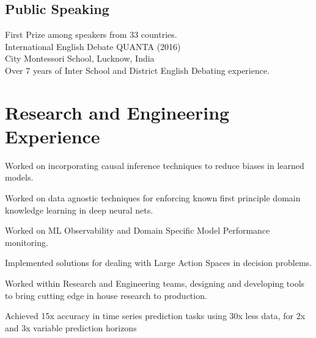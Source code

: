 \documentclass[]{deedy-resume-openfont}
\begin{document}
\begin{minipage}[t]{0.33\textwidth}
\subsection{Public Speaking}
\textbullet{} First Prize among speakers from 33 countries. \\
International English Debate QUANTA (2016) \\
City Montessori School, Lucknow, India \\
\textbullet{} Over 7 years of Inter School and District English Debating experience.
\sectionsep

%
%

\end{minipage} 
\hfill
\begin{minipage}[t]{0.66\textwidth} 


\section{Research and Engineering Experience}
\vspace{\topsep} %
\begin{tightemize}
        \item {Worked on incorporating causal inference techniques to reduce biases in learned models.}
        \item {Worked on data agnostic techniques for enforcing known first principle domain knowledge learning in deep neural nets.}
        \item {Worked on ML Observability and Domain Specific Model Performance monitoring.}
        \item {Implemented solutions for dealing with Large Action Spaces in decision problems.}
        \item {Worked within Research and Engineering teams, designing and developing tools to bring cutting edge in house research to production.}
        \item {Achieved 15x accuracy in time series prediction tasks using 30x less data, for 2x and 3x variable prediction horizons}
\end{tightemize}
\sectionsep


\end{minipage}
\end{document}
